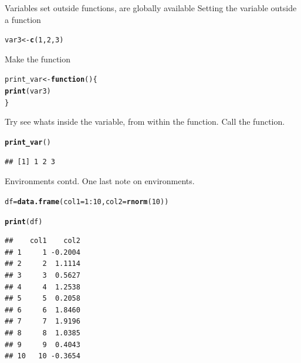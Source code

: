 \documentclass{beamer}\usepackage[]{graphicx}\usepackage[]{color}
\makeatletter
\newcommand{\hlnum}[1]{\textcolor[rgb]{0.686,0.059,0.569}{#1}}%
\newcommand{\hlopt}[1]{\textcolor[rgb]{0,0,0}{#1}}%
\newcommand{\hlstd}[1]{\textcolor[rgb]{0.345,0.345,0.345}{#1}}%
\newcommand{\hlkwa}[1]{\textcolor[rgb]{0.161,0.373,0.58}{\textbf{#1}}}%
\newcommand{\hlkwb}[1]{\textcolor[rgb]{0.69,0.353,0.396}{#1}}%
\newcommand{\hlkwc}[1]{\textcolor[rgb]{0.333,0.667,0.333}{#1}}%
\newcommand{\hlkwd}[1]{\textcolor[rgb]{0.737,0.353,0.396}{\textbf{#1}}}%
\newenvironment{kframe}{%
 \def\at@end@of@kframe{}%
 \ifinner\ifhmode%
  \def\at@end@of@kframe{\end{minipage}}%
  \begin{minipage}{\columnwidth}%
 \fi\fi%
 \def\FrameCommand##1{\hskip\@totalleftmargin \hskip-\fboxsep
 \colorbox{shadecolor}{##1}\hskip-\fboxsep
     \hskip-\linewidth \hskip-\@totalleftmargin \hskip\columnwidth}%
 \MakeFramed {\advance\hsize-\width
   \@totalleftmargin\z@ \linewidth\hsize
   \@setminipage}}%
 {\par\unskip\endMakeFramed%
 \at@end@of@kframe}
\newenvironment{knitrout}{}{} %
\makeatother
\begin{document}
\begin{frame}[fragile]{Variables set outside functions, are globally available}
Setting the variable outside a function
\begin{knitrout}
\color{fgcolor}\begin{kframe}
\begin{alltt}
\hlstd{var3} \hlkwb{<-} \hlkwd{c}\hlstd{(}\hlnum{1}\hlstd{,} \hlnum{2}\hlstd{,} \hlnum{3}\hlstd{)}
\end{alltt}
\end{kframe}
\end{knitrout}

Make the function
\begin{knitrout}
\color{fgcolor}\begin{kframe}
\begin{alltt}
\hlstd{print_var} \hlkwb{<-} \hlkwa{function}\hlstd{() \{}
    \hlkwd{print}\hlstd{(var3)}
\hlstd{\}}
\end{alltt}
\end{kframe}
\end{knitrout}

Try see whats inside the variable, from within the function.
\linebreak
Call the function.
\begin{knitrout}
\color{fgcolor}\begin{kframe}
\begin{alltt}
\hlkwd{print_var}\hlstd{()}
\end{alltt}
\begin{verbatim}
## [1] 1 2 3
\end{verbatim}
\end{kframe}
\end{knitrout}

\end{frame}


\begin{frame}[fragile]{Environments contd.}
One last note on environments.
\begin{knitrout}
\color{fgcolor}\begin{kframe}
\begin{alltt}
\hlstd{df} \hlkwb{=} \hlkwd{data.frame}\hlstd{(}\hlkwc{col1} \hlstd{=} \hlnum{1}\hlopt{:}\hlnum{10}\hlstd{,} \hlkwc{col2} \hlstd{=} \hlkwd{rnorm}\hlstd{(}\hlnum{10}\hlstd{))}

\hlkwd{print}\hlstd{(df)}
\end{alltt}
\begin{verbatim}
##    col1    col2
## 1     1 -0.2004
## 2     2  1.1114
## 3     3  0.5627
## 4     4  1.2538
## 5     5  0.2058
## 6     6  1.8460
## 7     7  1.9196
## 8     8  1.0385
## 9     9  0.4043
## 10   10 -0.3654
\end{verbatim}
\end{kframe}
\end{knitrout}


\end{frame}
\end{document}
